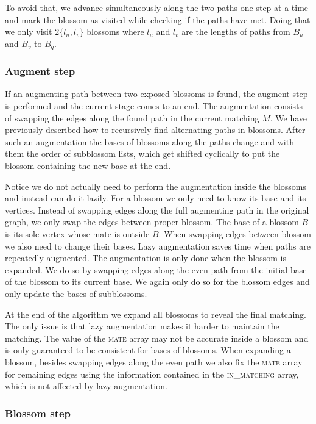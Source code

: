 To avoid that, we advance simultaneously along the two paths one step at a time and mark the blossom as visited while checking if the paths have met. Doing that we only visit $2\{l_u, l_v\}$ blossoms where $l_u$ and $l_v$ are the lengths of paths from $B_u$ and $B_v$ to $B_q$.

\subsubsection*{Augment step}

If an augmenting path between two exposed blossoms is found, the augment step is performed and the current stage comes to an end. The augmentation consists of swapping the edges along the found path in the current matching $M$. We have previously described how to recursively find alternating paths in blossoms. After such an augmentation the bases of blossoms along the paths change and with them the order of subblossom lists, which get shifted cyclically to put the blossom containing the new base at the end. 

Notice we do not actually need to perform the augmentation inside the blossoms and instead can do it lazily. For a blossom we only need to know its base and its vertices. Instead of swapping edges along the full augmenting path in the original graph, we only swap the edges between proper blossom. The base of a blossom $B$ is its sole vertex whose mate is outside $B$. When swapping edges between blossom we also need to change their bases. Lazy augmentation saves time when paths are repeatedly augmented. The augmentation is only done when the blossom is expanded. We do so by swapping edges along the even path from the  initial base of the blossom to its current base. We again only do so for the blossom edges and only update the bases of subblossoms.

At the end of the algorithm we expand all blossoms to reveal the final matching. The only issue is that lazy augmentation makes it harder to maintain the matching. The value of the \textsc{mate} array may not be accurate inside a blossom and is only guaranteed to be consistent for bases of blossoms.  When expanding a blossom, besides swapping edges along the even path we also fix the \textsc{mate} array for remaining edges using the information contained in the \textsc{in\_matching} array, which is not affected by lazy augmentation.

\subsubsection*{Blossom step}

